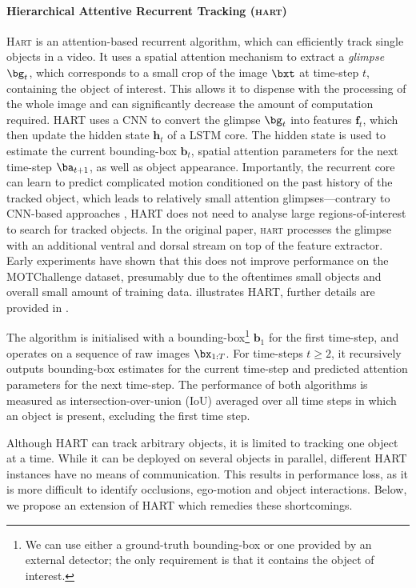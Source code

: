 \paragraph{Hierarchical Attentive Recurrent Tracking (\textsc{hart})}
\textsc{Hart} is an attention-based recurrent algorithm, which can efficiently track single objects in a video.
It uses a spatial attention mechanism to extract a \textit{glimpse} $\bg_t$, which corresponds to a small crop of the image $\bxt$ at time-step $t$, containing the object of interest.
This allows it to dispense with the processing of the whole image and can significantly decrease the amount of computation required.
\Gls{HART} uses a \gls{CNN} to convert the glimpse $\bg_t$ into features $\mathbf{f}_t$, which then update the hidden state $\mathbf{h}_t$ of a \gls{LSTM} core.
The hidden state is used to estimate the current bounding-box $\mathbf{b}_t$, spatial attention parameters for the next time-step $\ba_{t+1}$, as well as object appearance.
Importantly, the recurrent core can learn to predict complicated motion conditioned on the past history of the tracked object, which leads to relatively small attention glimpses---contrary to \gls{CNN}-based approaches \citep{Held2016goturn,Valmadre2017}, \gls{HART} does not need to analyse large regions-of-interest to search for tracked objects.
In the original paper, \textsc{hart} processes the glimpse with an additional ventral and dorsal stream on top of the feature extractor. Early experiments have shown that this does not improve performance on the MOTChallenge dataset, presumably due to the oftentimes small objects and overall small amount of training data. 
 illustrates \gls{HART}, further details are provided in .

	The algorithm is initialised with a bounding-box\footnote{We can use either a ground-truth bounding-box or one provided by an external detector; the only requirement is that it contains the object of interest.} $\mathbf{b}_1$ for the first time-step, and operates on a sequence of raw images $\bx_{1:T}$.
	For time-steps $t\geq2$, it recursively outputs bounding-box estimates for the current time-step and predicted attention parameters for the next time-step. The performance of both algorithms is measured as intersection-over-union (IoU) averaged over all time steps in which an object is present, excluding the first time step.

Although \gls{HART} can track arbitrary objects, it is limited to tracking one object at a time.
While it can  be deployed on several objects in parallel, different \gls{HART} instances have no means of communication.
This results in performance loss, as it is more difficult to identify 
occlusions, ego-motion and object interactions.
Below, we propose an extension of \gls{HART} which remedies these shortcomings.

